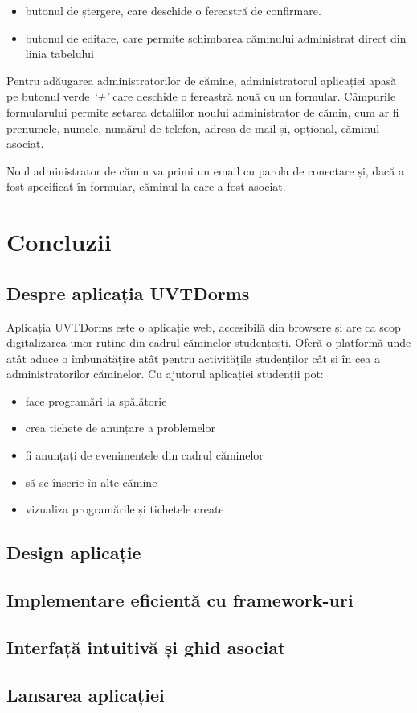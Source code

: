 \documentclass[12pt,a4paper]{report}
\theoremstyle{definition}
\theoremstyle{remark}
\begin{document}
\begin{itemize}
    \item butonul de ștergere, care deschide o fereastră de confirmare.
    \item butonul de editare, care permite schimbarea căminului administrat direct din linia tabelului
\end{itemize}


\par Pentru adăugarea administratorilor de cămine, administratorul aplicației apasă pe butonul verde \textit{`+'} care deschide o fereastră nouă cu un formular. Câmpurile formularului permite setarea detaliilor noului administrator de cămin, cum ar fi prenumele, numele, numărul de telefon, adresa de mail și, opțional, căminul asociat.

\par Noul administrator de cămin va primi un email cu parola de conectare și, dacă a fost specificat în formular, căminul la care a fost asociat.


\chapter{Concluzii}

\section{Despre aplicația UVTDorms}

\par Aplicația UVTDorms este o aplicație web, accesibilă din browsere și are ca scop digitalizarea unor rutine din cadrul căminelor studențești. Oferă o platformă unde atât aduce o îmbunătățire atât pentru activitățile studenților cât și în cea a administratorilor căminelor. Cu ajutorul aplicației studenții pot:

\begin{itemize}
    \item face programări la spălătorie
    \item crea tichete de anunțare a problemelor
    \item fi anunțați de evenimentele din cadrul căminelor
    \item să se înscrie în alte cămine
    \item vizualiza programările și tichetele create
\end{itemize}

\section{Design aplicație}
\section{Implementare eficientă cu framework-uri}
\section{Interfață intuitivă și ghid asociat}
\section{Lansarea aplicației}



\end{document}
